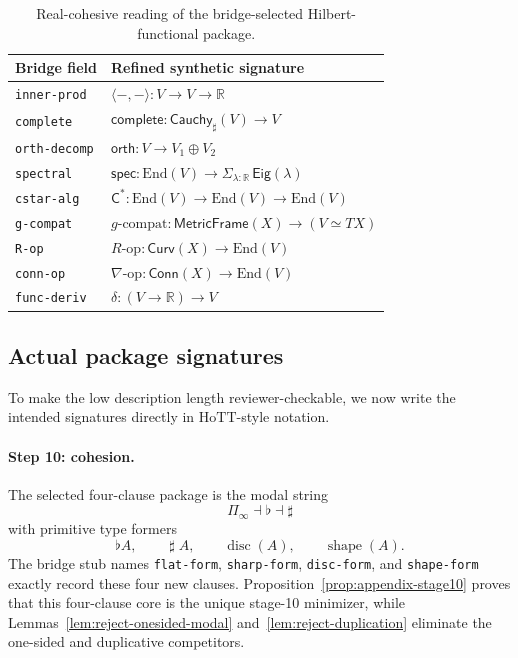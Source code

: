 \documentclass{lmcs}
\theoremstyle{plain}
\theoremstyle{definition}
\theoremstyle{remark}
\newcommand{\R}{\ensuremath{\mathbb{R}}}
\newcommand{\disc}{\ensuremath{\operatorname{disc}}}
\newcommand{\shape}{\ensuremath{\operatorname{shape}}}
\newcommand{\sharpm}{\ensuremath{\mathbin{\sharp}}}
\newcommand{\HoTT}{\ensuremath{\mathrm{HoTT}}}
\begin{document}
\begin{table}[tbp]
\centering
\caption{Real-cohesive reading of the bridge-selected Hilbert-functional package.}
\label{tab:hilbert-reading}
\small
\begin{tabular}{@{}ll@{}}
\toprule
Bridge field & Refined synthetic signature \\
\midrule
\texttt{inner-prod}  & $\langle-,-\rangle : V\to V\to \R$ \\
\texttt{complete}    & $\mathsf{complete} : \mathsf{Cauchy}_{\sharpm}(V)\to V$ \\
\texttt{orth-decomp} & $\mathsf{orth} : V \to V_1\oplus V_2$ \\
\texttt{spectral}    & $\mathsf{spec} : \mathrm{End}(V)\to \Sigma_{\lambda:\R}\,\mathsf{Eig}(\lambda)$ \\
\texttt{cstar-alg}   & $\mathsf{C^\ast} : \mathrm{End}(V)\to \mathrm{End}(V)\to \mathrm{End}(V)$ \\
\texttt{g-compat}    & $g\text{-compat} : \mathsf{MetricFrame}(X)\to (V\simeq TX)$ \\
\texttt{R-op}        & $R\text{-op} : \mathsf{Curv}(X)\to \mathrm{End}(V)$ \\
\texttt{conn-op}     & $\nabla\text{-op} : \mathsf{Conn}(X)\to \mathrm{End}(V)$ \\
\texttt{func-deriv}  & $\delta : (V\to \R)\to V$ \\
\bottomrule
\end{tabular}
\end{table}

\subsection{Actual package signatures}

To make the low description length reviewer-checkable, we now write the intended signatures directly in \HoTT-style notation.

\paragraph{Step 10: cohesion.}
The selected four-clause package is the modal string
\[
  \Pi_\infty \dashv \flat \dashv \sharpm
\]
with primitive type formers
\[
  \flat A,\qquad \sharpm A,\qquad \disc(A),\qquad \shape(A).
\]
The bridge stub names \texttt{flat-form}, \texttt{sharp-form}, \texttt{disc-form}, and \texttt{shape-form} exactly record these four new clauses. Proposition~\ref{prop:appendix-stage10} proves that this four-clause core is the unique stage-10 minimizer, while Lemmas~\ref{lem:reject-onesided-modal} and~\ref{lem:reject-duplication} eliminate the one-sided and duplicative competitors.
\end{document}
